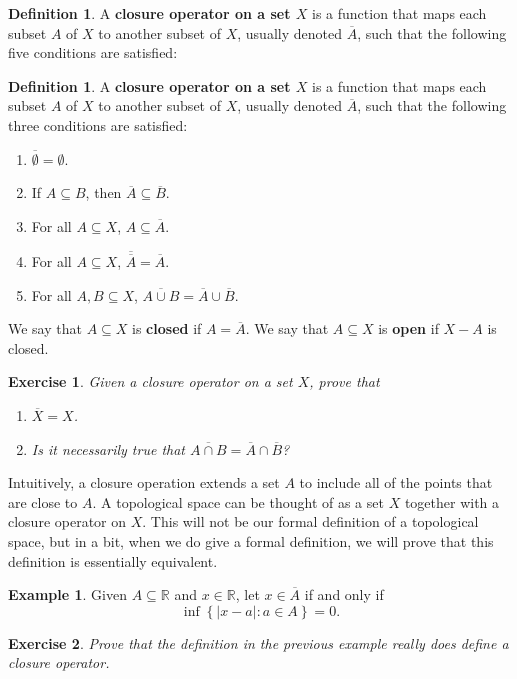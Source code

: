 \documentclass[12pt]{amsart}
\newtheorem{exercise}{Exercise}[section]
\theoremstyle{definition}
\newtheorem{example}[theorem]{Example}
\newtheorem{definition}[theorem]{Definition}
\theoremstyle{remark}
\newcommand{\R}{\mathbb{R}}
\newcommand{\explicitSet}[1]{\left\lbrace #1 \right\rbrace}
\newcommand{\set}[2]{\explicitSet{#1 \colon #2}}
\newcommand{\0}{\emptyset}
\newcommand{\closure}[1]{\overline{#1}}
\begin{document}
\begin{definition}A \textbf{closure operator on a set $X$} is a function that maps each subset $A$ of $X$ to another subset of $X$, usually denoted $\closure{A}$, such that the following five conditions are satisfied:
\begin{definition}
A \textbf{closure operator on a set $X$} is a function that maps each subset $A$ of $X$ to another subset of $X$, usually denoted $\closure{A}$, such that the following three conditions are satisfied:
\begin{enumerate}
\item $\closure{\0} = \0$.
\item If $A \subseteq B$, then $\closure{A} \subseteq \closure{B}$.
\item For all $A \subseteq X$, $A \subseteq \closure{A}$.
\item For all $A \subseteq X$, $\closure{\closure{A}} = \closure{A}$.
\item For all $A,B \subseteq X$, $\closure{A \cup B} = \closure{A} \cup \closure{B}$.
\end{enumerate} 
We say that $A \subseteq X$ is \textbf{closed} if $A = \closure{A}$. We say that $A \subseteq X$ is \textbf{open} if $X-A$ is closed.
\end{definition}

\begin{exercise}
Given a closure operator on a set $X$, prove that
\begin{enumerate}
\item $\closure{X} = X$.
\item Is it necessarily true that $\closure{A \cap B} = \closure{A} \cap \closure{B}$?
\end{enumerate}
\end{exercise}

Intuitively, a closure operation extends a set $A$ to include all of the points that are close to $A$. A topological space can be thought of as a set $X$ together with a closure operator on $X$. This will not be our formal definition of a topological space, but in a bit, when we do give a formal definition, we will prove that this definition is essentially equivalent.

\begin{example}
Given $A \subseteq \R$ and $x \in \R$, let $x \in \closure{A}$ if and only if
$$\inf \set{|x-a|}{a \in A} = 0.$$
\end{example}

\begin{exercise}
Prove that the definition in the previous example really does define a closure operator.
\end{exercise}


\end{definition}
\end{document}
